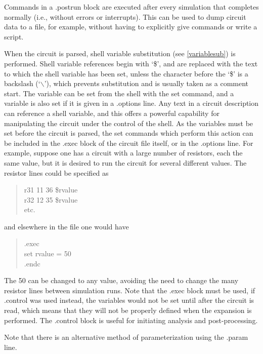 Commands in a {\vt .postrun} block are executed after every simulation
that completes normally (i.e., without errors or interrupts).  This
can be used to dump circuit data to a file, for example, without
having to explicitly give commands or write a script.

When the circuit is parsed, shell variable substitution (see
\ref{variablesub}) is performed.  Shell variable references begin with
`{\vt \$}', and are replaced with the text to which the shell variable
has been set, unless the character before the `{\vt \$}' is a
backslash (`$\backslash$'), which prevents substitution and is usually
taken as a comment start.  The variable can be set from the shell with
the {\cb set} command, and a variable is also set if it is given in a
{\vt .options} line.  Any text in a circuit description can reference
a shell variable, and this offers a powerful capability for
manipulating the circuit under the control of the shell.  As the
variables must be set before the circuit is parsed, the {\cb set}
commands which perform this action can be included in the {\vt .exec}
block of the circuit file itself, or in the {\vt .options} line.  For
example, suppose one has a circuit with a large number of resistors,
each the same value, but it is desired to run the circuit for several
different values.  The resistor lines could be specified as
\begin{quote}\vt
r31 11 36 \$rvalue\\
r32 12 35 \$rvalue\\
{\rm etc.}
\end{quote}
and elsewhere in the file one would have
\begin{quote}\vt
.exec\\
set rvalue = 50\\
.endc
\end{quote}
The 50 can be changed to any value, avoiding the need to change the
many resistor lines between simulation runs.  Note that the {\vt .exec}
block must be used, if {\vt .control} was used instead, the variables
would not be set until after the circuit is read, which means that they
will not be properly defined when the expansion is performed.
The {\vt .control} block is useful for initiating analysis and
post-processing.

Note that there is an alternative method of parameterization using
the {\vt .param} line.

